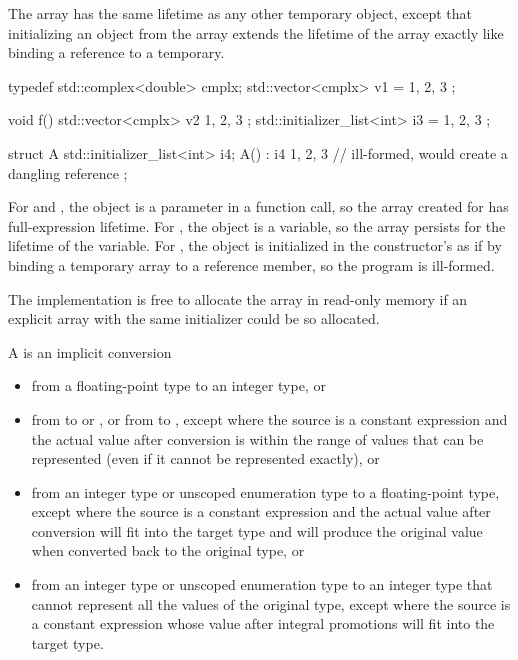 \pnum
The array has the same lifetime as any other temporary
object, except that initializing an
 object from the array extends the lifetime of
the array exactly like binding a reference to a temporary.
\begin{example}

\begin{codeblock}
typedef std::complex<double> cmplx;
std::vector<cmplx> v1 = { 1, 2, 3 };

void f() {
  std::vector<cmplx> v2{ 1, 2, 3 };
  std::initializer_list<int> i3 = { 1, 2, 3 };
}

struct A {
  std::initializer_list<int> i4;
  A() : i4{ 1, 2, 3 } {}            // ill-formed, would create a dangling reference
};
\end{codeblock}

For  and , the  object
is a parameter in a function call, so the array created for
 has full-expression lifetime.
For , the  object is a variable,
so the array persists for the lifetime of the variable.
For , the  object is initialized in
the constructor's  as if by binding
a temporary array to a reference member, so the program is
ill-formed.
\end{example}
\begin{note}
The implementation is free to allocate the array in read-only memory if an explicit array with the same initializer could be so allocated. \end{note}

\pnum
A
%
%
 is an implicit conversion

\begin{itemize}
\item from a floating-point type to an integer type, or

\item from  to  or , or from
 to , except where the source is a constant expression and
the actual value after conversion
is within the range of values that can be represented (even if it cannot be represented exactly),
or

\item from an integer type or unscoped enumeration type to a floating-point type, except
where the source is a constant expression and the actual value after conversion will fit
into the target type and will produce the original value when converted back to the
original type, or

\item from an integer type or unscoped enumeration type to an integer type that cannot
represent all the values of the original type, except where the source is a constant
expression whose value after integral promotions will fit into the target type.
\end{itemize}


